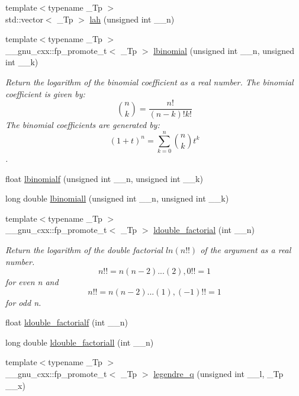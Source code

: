 \begin{DoxyCompactItemize}
\item 
{\footnotesize template$<$typename \+\_\+\+Tp $>$ }\\std\+::vector$<$ \+\_\+\+Tp $>$ \hyperlink{group__mathsf__gnu_ga161fe80a0d88f67a5a16ef2dcc3d4645}{lah} (unsigned int \+\_\+\+\_\+n)
\item 
{\footnotesize template$<$typename \+\_\+\+Tp $>$ }\\\+\_\+\+\_\+gnu\+\_\+cxx\+::fp\+\_\+promote\+\_\+t$<$ \+\_\+\+Tp $>$ \hyperlink{group__mathsf__gnu_gabfa5aeba56edfa110846fc8e76963bc2}{lbinomial} (unsigned int \+\_\+\+\_\+n, unsigned int \+\_\+\+\_\+k)
\begin{DoxyCompactList}\small\item\em Return the logarithm of the binomial coefficient as a real number. The binomial coefficient is given by\+: \[ \binom{n}{k} = \frac{n!}{(n-k)! k!} \] The binomial coefficients are generated by\+: \[ \left(1 + t\right)^n = \sum_{k=0}^n \binom{n}{k} t^k \]. \end{DoxyCompactList}\item 
float \hyperlink{group__mathsf__gnu_ga2fe55bab4211fb240e1eb01341914129}{lbinomialf} (unsigned int \+\_\+\+\_\+n, unsigned int \+\_\+\+\_\+k)
\item 
long double \hyperlink{group__mathsf__gnu_ga20e6c250e10e20b9e2c3f68bf9a3d4c1}{lbinomiall} (unsigned int \+\_\+\+\_\+n, unsigned int \+\_\+\+\_\+k)
\item 
{\footnotesize template$<$typename \+\_\+\+Tp $>$ }\\\+\_\+\+\_\+gnu\+\_\+cxx\+::fp\+\_\+promote\+\_\+t$<$ \+\_\+\+Tp $>$ \hyperlink{group__mathsf__gnu_ga43bf9a20282d5b9237bf352682a48395}{ldouble\+\_\+factorial} (int \+\_\+\+\_\+n)
\begin{DoxyCompactList}\small\item\em Return the logarithm of the double factorial $ ln(n!!) $ of the argument as a real number. \[ n!! = n(n-2)...(2), 0!! = 1 \] for even {\ttfamily n} and \[ n!! = n(n-2)...(1), (-1)!! = 1 \] for odd {\ttfamily n}. \end{DoxyCompactList}\item 
float \hyperlink{group__mathsf__gnu_ga33ecc59a7ff139b483cebf42ecd4fe79}{ldouble\+\_\+factorialf} (int \+\_\+\+\_\+n)
\item 
long double \hyperlink{group__mathsf__gnu_gae8fa4b4866cfd20349c985b33ed2936e}{ldouble\+\_\+factoriall} (int \+\_\+\+\_\+n)
\item 
{\footnotesize template$<$typename \+\_\+\+Tp $>$ }\\\+\_\+\+\_\+gnu\+\_\+cxx\+::fp\+\_\+promote\+\_\+t$<$ \+\_\+\+Tp $>$ \hyperlink{group__mathsf__gnu_gadad5b22d0075dca31690907668af568f}{legendre\+\_\+q} (unsigned int \+\_\+\+\_\+l, \+\_\+\+Tp \+\_\+\+\_\+x)

\end{DoxyCompactItemize}

